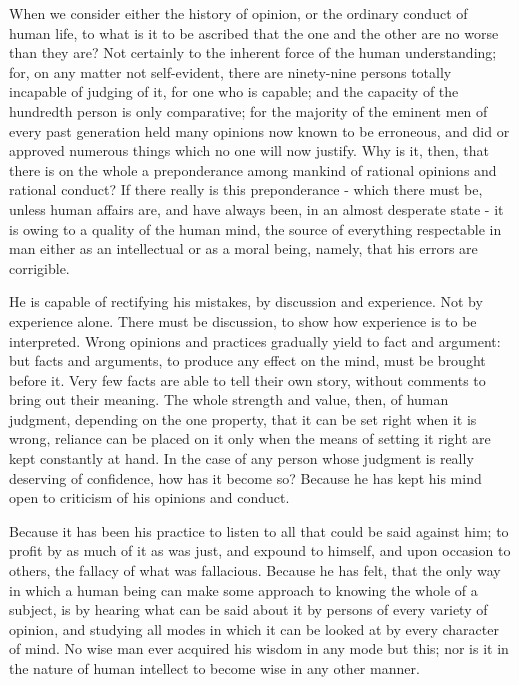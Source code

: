 When we consider either the history of opinion, or the ordinary conduct of human life, to what is it to be ascribed that the one and the other are no worse than they are? Not certainly to the inherent force of the human understanding; for, on any matter not self-evident, there are ninety-nine persons totally incapable of judging of it, for one who is capable; and the capacity of the hundredth person is only comparative; for the majority of the eminent men of every past generation held many opinions now known to be erroneous, and did or approved numerous things which no one will now justify. Why is it, then, that there is on the whole a preponderance among mankind of rational opinions and rational conduct? If there really is this preponderance - which there must be, unless human affairs are, and have always been, in an almost desperate state - it is owing to a quality of the human mind, the source of everything respectable in man either as an intellectual or as a moral being, namely, that his errors are corrigible.\par

He is capable of rectifying his mistakes, by discussion and experience. Not by experience alone. There must be discussion, to show how experience is to be interpreted. Wrong opinions and practices gradually yield to fact and argument: but facts and arguments, to produce any effect on the mind, must be brought before it. Very few facts are able to tell their own story, without comments to bring out their meaning. The whole strength and value, then, of human judgment, depending on the one property, that it can be set right when it is wrong, reliance can be placed on it only when the means of setting it right are kept constantly at hand. In the case of any person whose judgment is really deserving of confidence, how has it become so? Because he has kept his mind open to criticism of his opinions and conduct.\par

Because it has been his practice to listen to all that could be said against him; to profit by as much of it as was just, and expound to himself, and upon occasion to others, the fallacy of what was fallacious. Because he has felt, that the only way in which a human being can make some approach to knowing the whole of a subject, is by hearing what can be said about it by persons of every variety of opinion, and studying all modes in which it can be looked at by every character of mind. No wise man ever acquired his wisdom in any mode but this; nor is it in the nature of human intellect to become wise in any other manner.\par

